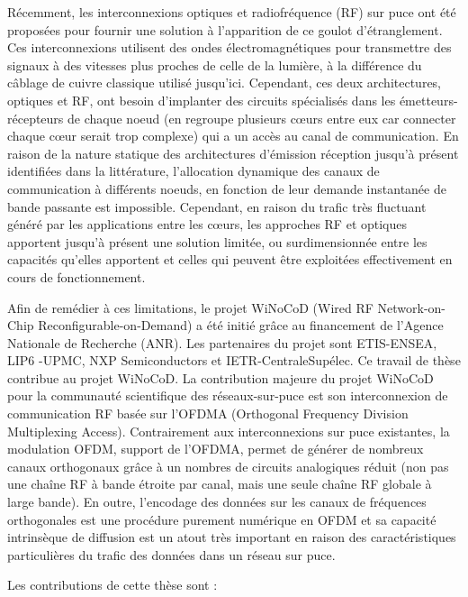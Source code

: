 Récemment, les interconnexions optiques et radiofréquence (RF) sur puce ont été proposées pour fournir une solution à l’apparition de ce goulot d'étranglement. Ces interconnexions utilisent des ondes électromagnétiques pour transmettre des signaux à des vitesses plus proches de celle de la lumière, à la différence du câblage de cuivre classique utilisé jusqu’ici. Cependant, ces deux architectures, optiques et RF, ont besoin d'implanter des circuits spécialisés dans les émetteurs-récepteurs de chaque noeud (en regroupe plusieurs cœurs entre eux car connecter chaque cœur serait trop complexe) qui a un accès au canal de communication. En raison de la nature statique des architectures d’émission réception jusqu’à présent identifiées dans la littérature, l'allocation dynamique des canaux de communication à différents noeuds, en fonction de leur demande instantanée de bande passante est impossible. Cependant, en raison du trafic très fluctuant généré par les applications entre les cœurs, les approches RF et optiques apportent jusqu’à présent une solution limitée, ou surdimensionnée entre les capacités qu’elles apportent et celles qui peuvent être exploitées effectivement en cours de fonctionnement. 

Afin de remédier à ces limitations, le projet WiNoCoD (Wired RF Network-on-Chip Reconfigurable-on-Demand) a été initié grâce au financement de l'Agence Nationale de Recherche (ANR). Les partenaires du projet sont ETIS-ENSEA, LIP6 -UPMC, NXP Semiconductors et IETR-CentraleSupélec. Ce travail de thèse contribue au projet WiNoCoD. La contribution majeure du projet WiNoCoD pour la communauté scientifique des réseaux-sur-puce est son interconnexion de communication RF basée sur l’OFDMA (Orthogonal Frequency Division Multiplexing Access). Contrairement aux interconnexions sur puce existantes, la modulation OFDM, support de l’OFDMA, permet de générer de nombreux canaux orthogonaux grâce à un nombres de circuits analogiques réduit (non pas une chaîne RF à bande étroite par canal, mais une seule chaîne RF globale à large bande). En outre, l’encodage des données sur les canaux de fréquences orthogonales est une procédure purement numérique en OFDM et sa capacité intrinsèque de diffusion est un atout très important en raison des caractéristiques particulières du trafic des données dans un réseau sur puce.

Les contributions de cette thèse sont :

